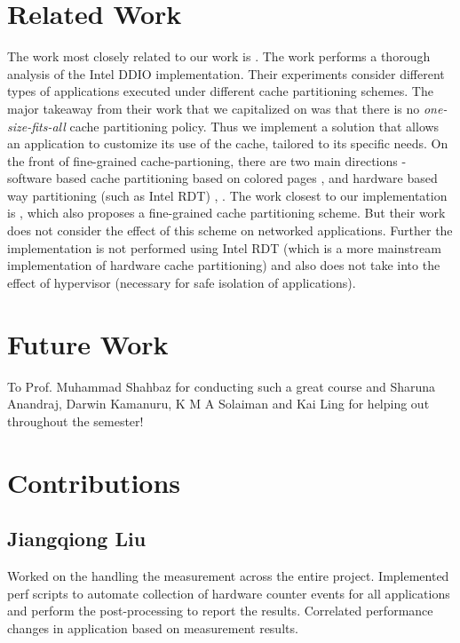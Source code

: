 \documentclass[sigconf,authorversion,noacm]{acmart}
\begin{document}
\section{Related Work}
The work most closely related to our work is \cite{alireza_2020}. The work
performs a thorough analysis of the Intel DDIO implementation. Their experiments
consider different types of applications executed under different cache
partitioning schemes. The major takeaway from their work that we capitalized on
was that there is no \textit{one-size-fits-all} cache partitioning policy. Thus
we implement a solution that allows an application to customize its use of the
cache, tailored to its specific needs. On the front of fine-grained
cache-partioning, there are two main directions - software based cache
partitioning based on colored pages \cite{herter}, \cite{sherwood} and hardware
based way partitioning (such as Intel RDT) \cite{chen}, \cite{assaf}. The work
closest to our implementation is \cite{swap}, which also proposes a fine-grained
cache partitioning scheme. But their work does not consider the effect of this
scheme on networked applications. Further the implementation is not performed
using Intel RDT (which is a more mainstream implementation of hardware cache
partitioning) and also does not take into the effect of hypervisor (necessary
for safe isolation of applications).

\section{Future Work}

\begin{acks}
    To Prof. Muhammad Shahbaz for conducting such a great course and Sharuna
    Anandraj, Darwin Kamanuru, K M A Solaiman and Kai Ling for helping out
    throughout the semester!
\end{acks}





\appendix

\section{Contributions}

\subsection{Jiangqiong Liu}
Worked on the handling the measurement across the entire project. Implemented
perf scripts to automate collection of hardware counter events for all
applications and perform the post-processing to report the results. Correlated
performance changes in application based on measurement results.
\end{document}

